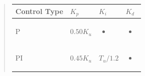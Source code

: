\begin{quote}
\begin{longtable}[]{@{}llll@{}}
\toprule
\begin{minipage}[b]{0.18\columnwidth}\raggedright
Control Type\strut
\end{minipage} & \begin{minipage}[b]{0.22\columnwidth}\raggedright
\(K_p\)\strut
\end{minipage} & \begin{minipage}[b]{0.22\columnwidth}\raggedright
\(K_i\)\strut
\end{minipage} & \begin{minipage}[b]{0.25\columnwidth}\raggedright
\(K_d\)\strut
\end{minipage}\tabularnewline
\midrule
\endhead
\begin{minipage}[t]{0.18\columnwidth}\raggedright
P\strut
\end{minipage} & \begin{minipage}[t]{0.22\columnwidth}\raggedright
\(0.50K_u\)\strut
\end{minipage} & \begin{minipage}[t]{0.22\columnwidth}\raggedright
\begin{itemize}
\tightlist
\item
\end{itemize}\strut
\end{minipage} & \begin{minipage}[t]{0.25\columnwidth}\raggedright
\begin{itemize}
\tightlist
\item
\end{itemize}\strut
\end{minipage}\tabularnewline
\begin{minipage}[t]{0.18\columnwidth}\raggedright
PI\strut
\end{minipage} & \begin{minipage}[t]{0.22\columnwidth}\raggedright
\(0.45K_u\)\strut
\end{minipage} & \begin{minipage}[t]{0.22\columnwidth}\raggedright
\(T_u/1.2\)\strut
\end{minipage} & \begin{minipage}[t]{0.25\columnwidth}\raggedright
\begin{itemize}
\tightlist
\item
\end{itemize}\strut
\end{minipage}\tabularnewline

\end{longtable}
\end{quote}

